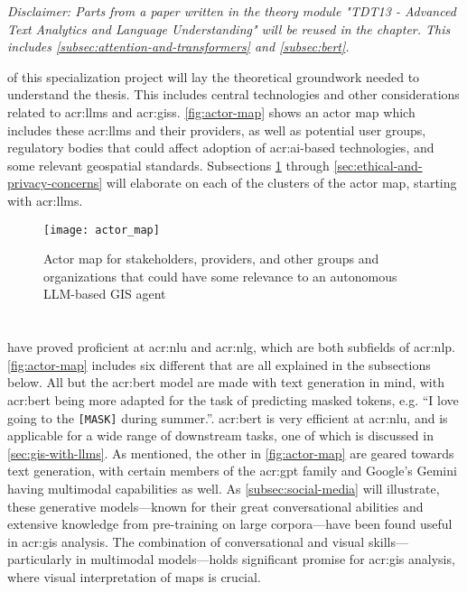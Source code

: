 \textit{Disclaimer: Parts from a paper written in the theory module "TDT13 - Advanced Text Analytics and Language Understanding" will be reused in the  chapter. This includes \autoref{subsec:attention-and-transformers} and \autoref{subsec:bert}.}

\vspace{12pt}

 of this specialization project will lay the theoretical groundwork needed to understand the thesis. This includes central technologies and other considerations related to \glspl{acr:llm} and \glspl{acr:gis}. \autoref{fig:actor-map} shows an actor map which includes these \glspl{acr:llm} and their providers, as well as potential user groups, regulatory bodies that could affect adoption of \acrshort{acr:ai}-based technologies, and some relevant geospatial standards. Subsections \ref{sec:llms} through \ref{sec:ethical-and-privacy-concerns} will elaborate on each of the clusters of the actor map, starting with \glspl{acr:llm}.

\begin{figure}
    \texttt{[image: actor\_map]}
    \caption{Actor map for stakeholders, providers, and other groups and organizations that could have some relevance to an autonomous LLM-based GIS agent}
    \label{fig:actor-map}
\end{figure}

\section[Large Language Models]{}\label{sec:llms}

 have proved proficient at \gls{acr:nlu} and \gls{acr:nlg}, which are both subfields of \gls{acr:nlp}. \autoref{fig:actor-map} includes six different  that are all explained in the subsections below. All but the \acrshort{acr:bert} model are made with text generation in mind, with \acrshort{acr:bert} being more adapted for the task of predicting masked tokens, e.g. \enquote{I love going to the \texttt{[MASK]} during summer.}. \acrshort{acr:bert} is very efficient at \gls{acr:nlu}, and is applicable for a wide range of downstream tasks, one of which is discussed in \autoref{sec:gis-with-llms}. As mentioned, the other  in \autoref{fig:actor-map} are geared towards text generation, with certain members of the \acrshort{acr:gpt} family and Google's Gemini having multimodal capabilities as well. As \autoref{subsec:social-media} will illustrate, these generative models---known for their great conversational abilities and extensive knowledge from pre-training on large corpora---have been found useful in \gls{acr:gis} analysis. The combination of conversational and visual skills---particularly in multimodal models---holds significant promise for \gls{acr:gis} analysis, where visual interpretation of maps is crucial.

